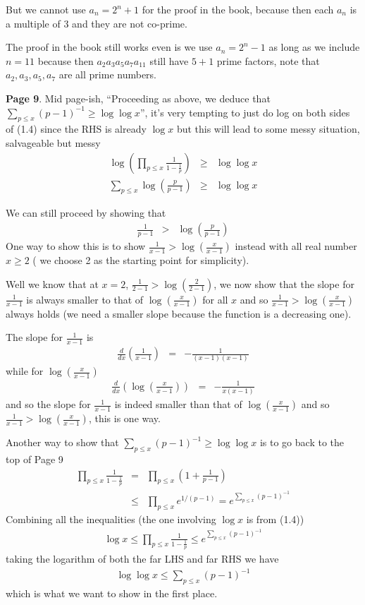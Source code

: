 \documentclass[aps,preprint,preprintnumbers,nofootinbib,showpacs,prd]{revtex4-1}
\newcommand{\nbea}{\begin{eqnarray*}}
\newcommand{\neea}{\end{eqnarray*}}
\begin{document}
But we cannot use $a_n = 2^n + 1$ for the proof in the book, because then each $a_n$ is a multiple of 3 and they are not co-prime.

The proof in the book still works even is we use $a_n = 2^n - 1$ as long as we include $n=11$ because then $a_2a_3a_5a_7a_{11}$ still have $5+1$ prime factors, note that $a_2,a_3,a_5,a_7$ are all prime numbers.

{\bf Page 9}. Mid page-ish, ``Proceeding as above, we deduce that $\sum_{p\le x}(p-1)^{-1} \ge \log \log x$'', it's very tempting to just do log on both sides of (1.4) since the RHS is already $\log x$ but this will lead to some messy situation, salvageable but messy
%
\nbea
\log \left ( \prod_{p\le x} \frac{1}{1 - \frac{1}{p}} \right ) & \ge & \log \log x \\
\sum_{p\le x} \log \left (\frac{p}{p-1}\right ) & \ge & \log \log x
\neea
%

We can still proceed by showing that
%
\nbea
\frac{1}{p - 1} & > & \log \left (\frac{p}{p-1}\right )
\neea
%
One way to show this is to show $\frac{1}{x - 1} > \log \left (\frac{x}{x-1}\right )$ instead with all real number $x \ge 2$ ( we choose 2 as the starting point for simplicity).

Well we know that at $x = 2$, $\frac{1}{2 - 1} > \log \left (\frac{2}{2-1}\right )$, we now show that the slope for $\frac{1}{x - 1}$ is always smaller to that of $\log \left (\frac{x}{x-1}\right )$ for all $x$ and so $\frac{1}{x - 1} > \log \left (\frac{x}{x-1}\right )$ always holds (we need a smaller slope because the function is a decreasing one).

The slope for $\frac{1}{x - 1}$ is
%
\nbea
\frac{d}{dx}\left( \frac{1}{x - 1} \right ) & = & -\frac{1}{(x-1)(x-1)}
\neea
%
while for $\log \left (\frac{x}{x-1}\right )$
%
\nbea
\frac{d}{dx} \left (\log \left (\frac{x}{x-1}\right ) \right ) & = & -\frac{1}{x(x-1)}
\neea
%
and so the slope for $\frac{1}{x - 1}$ is indeed smaller than that of $\log \left (\frac{x}{x-1}\right )$ and so $\frac{1}{x - 1} > \log \left (\frac{x}{x-1}\right )$, this is one way.

Another way to show that $\sum_{p\le x}(p-1)^{-1} \ge \log \log x$ is to go back to the top of Page 9
%
\nbea
\prod_{p \le x} \frac{1}{1 - \frac{1}{p}} & = & \prod_{p \le x} \left ( 1 + \frac{1}{p - 1} \right ) \\
& \le & \prod_{p \le x} e^{1/(p-1)} = e^{\sum_{p\le x}(p-1)^{-1}}
\neea
%
Combining all the inequalities (the one involving $\log x$ is from (1.4))
%
\nbea
\log x \le \prod_{p \le x} \frac{1}{1 - \frac{1}{p}} \le e^{\sum_{p\le x}(p-1)^{-1}}
\neea
%
taking the logarithm of both the far LHS and far RHS we have
%
\nbea
\log \log x \le \sum_{p\le x}(p-1)^{-1}
\neea
%
which is what we want to show in the first place.
\end{document}
